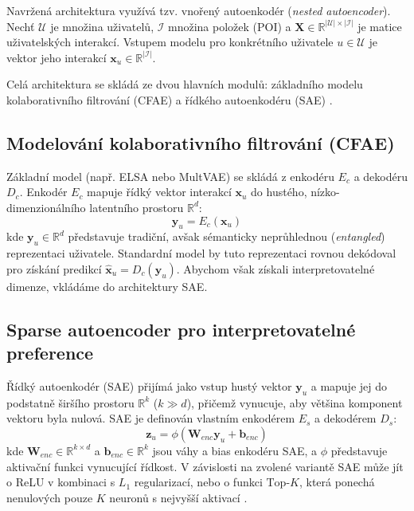 Navržená architektura využívá tzv. vnořený autoenkodér (\textit{nested autoencoder}). Nechť $\mathcal{U}$ je množina uživatelů, $\mathcal{I}$ množina položek (POI) a $\mathbf{X} \in \mathbb{R}^{|\mathcal{U}| \times |\mathcal{I}|}$ je matice uživatelských interakcí. Vstupem modelu pro konkrétního uživatele $u \in \mathcal{U}$ je vektor jeho interakcí $\mathbf{x}_u \in \mathbb{R}^{|\mathcal{I}|}$. 

Celá architektura se skládá ze dvou hlavních modulů: základního modelu kolaborativního filtrování (CFAE) a řídkého autoenkodéru (SAE) \cite{Wang2021}.

\subsection{Modelování kolaborativního filtrování (CFAE)}
Základní model (např. ELSA nebo MultVAE) se skládá z enkodéru $E_c$ a dekodéru $D_c$. Enkodér $E_c$ mapuje řídký vektor interakcí $\mathbf{x}_u$ do hustého, nízko-dimenzionálního latentního prostoru $\mathbb{R}^d$:
\begin{equation}
    \mathbf{y}_u = E_c(\mathbf{x}_u)
\end{equation}
kde $\mathbf{y}_u \in \mathbb{R}^d$ představuje tradiční, avšak sémanticky neprůhlednou (\textit{entangled}) reprezentaci uživatele. Standardní model by tuto reprezentaci rovnou dekódoval pro získání predikcí $\mathbf{\hat{x}}_u = D_c(\mathbf{y}_u)$. Abychom však získali interpretovatelné dimenze, vkládáme do architektury SAE.

\subsection{Sparse autoencoder pro interpretovatelné preference}
Řídký autoenkodér (SAE) přijímá jako vstup hustý vektor $\mathbf{y}_u$ a mapuje jej do podstatně širšího prostoru $\mathbb{R}^k$ ($k \gg d$), přičemž vynucuje, aby většina komponent vektoru byla nulová. SAE je definován vlastním enkodérem $E_s$ a dekodérem $D_s$:
\begin{equation}
    \mathbf{z}_u = \phi(\mathbf{W}_{enc}\mathbf{y}_u + \mathbf{b}_{enc})
\end{equation}
kde $\mathbf{W}_{enc} \in \mathbb{R}^{k \times d}$ a $\mathbf{b}_{enc} \in \mathbb{R}^k$ jsou váhy a bias enkodéru SAE, a $\phi$ představuje aktivační funkci vynucující řídkost. V závislosti na zvolené variantě SAE může jít o ReLU v kombinaci s $L_1$ regularizací, nebo o funkci $\text{Top-}K$, která ponechá nenulových pouze $K$ neuronů s nejvyšší aktivací \cite{Spisak2024}. 

